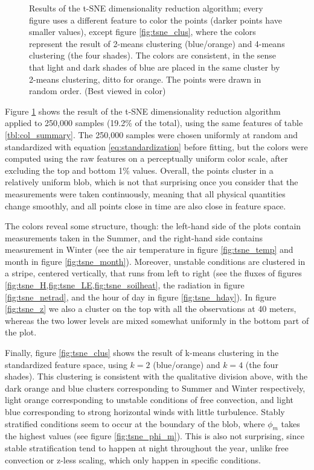 \documentclass[12pt]{book}
\begin{document}
\begin{figure}
    \caption{Results of the t-SNE dimensionality reduction algorithm; every figure uses a different feature to color the points (darker points have smaller values), except figure \ref{fig:tsne_clus}, where the colors represent the result of 2-means clustering (blue/orange) and 4-means clustering (the four shades). The colors are consistent, in the sense that light and dark shades of blue are placed in the same cluster by 2-means clustering, ditto for orange. The points were drawn in random order. (Best viewed in color)}
	\label{fig:tsne}
\end{figure}


Figure \ref{fig:tsne} shows the result of the t-SNE dimensionality reduction algorithm \citep{tsne} applied to 250,000 samples (19.2\% of the total), using the same features of table \ref{tbl:col_summary}. The 250,000 samples were chosen uniformly at random and standardized with equation \ref{eq:standardization} before fitting, but the colors were computed using the raw features on a perceptually uniform color scale, after excluding the top and bottom 1\% values. Overall, the points cluster in a relatively uniform blob, which is not that surprising once you consider that the measurements were taken continuously, meaning that all physical quantities change smoothly, and all points close in time are also close in feature space.

The colors reveal some structure, though: the left-hand side of the plots contain measurements taken in the Summer, and the right-hand side contains measurement in Winter (see the air temperature in figure \ref{fig:tsne_temp} and month in figure \ref{fig:tsne_month}). Moreover, unstable conditions are clustered in a stripe, centered vertically, that runs from left to right (see the fluxes of figures \cref{fig:tsne_H,fig:tsne_LE,fig:tsne_soilheat}, the radiation in figure \ref{fig:tsne_netrad}, and the hour of day in figure \ref{fig:tsne_hday}). In figure \ref{fig:tsne_z} we also a cluster on the top with all the observations at 40 meters, whereas the two lower levels are mixed somewhat uniformly in the bottom part of the plot.

Finally, figure \ref{fig:tsne_clus} shows the result of k-means clustering in the standardized feature space, using $k=2$ (blue/orange) and $k=4$ (the four shades). This clustering is consistent with the qualitative division above, with the dark orange and blue clusters corresponding to Summer and Winter respectively, light orange corresponding to unstable conditions of free convection, and light blue corresponding to strong horizontal winds with little turbulence. Stably stratified conditions seem to occur at the boundary of the blob, where $\phi_m$ takes the highest values (see figure \ref{fig:tsne_phi_m}). This is also not surprising, since stable stratification tend to happen at night throughout the year, unlike free convection or z-less scaling, which only happen in specific conditions.
\end{document}
